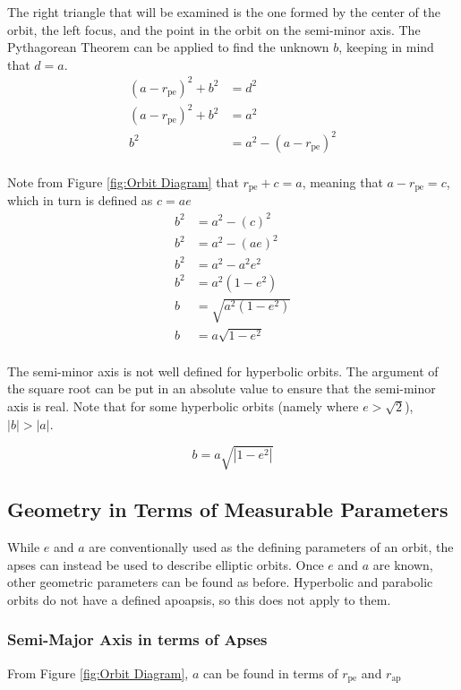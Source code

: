 \documentclass{article}
\begin{document}
The right triangle that will be examined is the one formed by the center of the orbit, the left focus, and the point in the orbit on the semi-minor axis. The Pythagorean Theorem can be applied to find the unknown $b$, keeping in mind that $d=a$.
\begin{align*}
    (a-r_\text{pe})^2+b^2 & = d^2                   \\
    (a-r_\text{pe})^2+b^2 & = a^2                   \\
    b^2                   & = a^2-(a-r_\text{pe})^2 \\
\end{align*}

Note from Figure \ref{fig:Orbit Diagram} that $r_\text{pe}+c=a$, meaning that $a-r_\text{pe}=c$, which in turn is defined as $c=ae$
\begin{align*}
    b^2 & = a^2-(c)^2         \\
    b^2 & = a^2-(ae)^2        \\
    b^2 & = a^2-a^2e^2        \\
    b^2 & = a^2(1-e^2)        \\
    b   & = \sqrt{a^2(1-e^2)} \\
    b   & = a\sqrt{1-e^2}     \\
\end{align*}

The semi-minor axis is not well defined for hyperbolic orbits. The argument of the square root can be put in an absolute value to ensure that the semi-minor axis is real. Note that for some hyperbolic orbits (namely where $e>\sqrt{2}$), $|b|>|a|$.

\begin{equation}\label{Semi Minor Axis Geometric}
    b=a\sqrt{|1-e^2|}
\end{equation}

\bigskip\bigskip
\subsection{Geometry in Terms of Measurable Parameters}\label{sec:Geometry in terms of Measurable Values}

While $e$ and $a$ are conventionally used as the defining parameters of an orbit, the apses can instead be used to describe elliptic orbits. Once $e$ and $a$ are known, other geometric parameters can be found as before. Hyperbolic and parabolic orbits do not have a defined apoapsis, so this does not apply to them.

\subsubsection{Semi-Major Axis in terms of Apses}
From Figure \ref{fig:Orbit Diagram}, $a$ can be found in terms of $r_\text{pe}$ and $r_\text{ap}$
\end{document}
